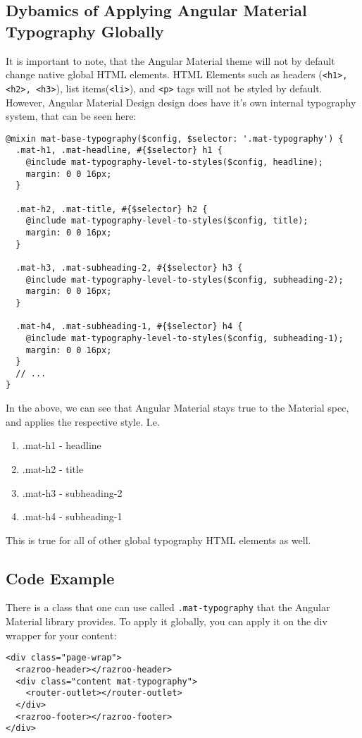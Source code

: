 \subsection{Dybamics of Applying Angular Material Typography Globally}
It is important to note, that the Angular Material theme will not by default 
change native global HTML elements. HTML Elements such as headers
(\lstinline{<h1>, <h2>, <h3>}), list items(\lstinline{<li>}), and \lstinline{<p>} 
tags will not be styled by default. However, Angular Material Design design 
does have it's own internal typography system, that can be seen here: 
\begin{lstlisting}[caption=@angular/material/\_theming.scss]
@mixin mat-base-typography($config, $selector: '.mat-typography') {
  .mat-h1, .mat-headline, #{$selector} h1 {
    @include mat-typography-level-to-styles($config, headline);
    margin: 0 0 16px;
  }

  .mat-h2, .mat-title, #{$selector} h2 {
    @include mat-typography-level-to-styles($config, title);
    margin: 0 0 16px;
  }

  .mat-h3, .mat-subheading-2, #{$selector} h3 {
    @include mat-typography-level-to-styles($config, subheading-2);
    margin: 0 0 16px;
  }

  .mat-h4, .mat-subheading-1, #{$selector} h4 {
    @include mat-typography-level-to-styles($config, subheading-1);
    margin: 0 0 16px;
  }  
  // ...
}
\end{lstlisting}

In the above, we can see that Angular Material stays true to the Material
spec, and applies the respective style. I.e. 
\begin{enumerate}
  \item .mat-h1 - headline
  \item .mat-h2 - title
  \item .mat-h3 - subheading-2
  \item .mat-h4 - subheading-1
\end{enumerate}

This is true for all of other global typography HTML elements as well. 

\subsection{Code Example}
There is a class that one can use called \lstinline{.mat-typography}
that the Angular Material library provides. To apply it globally, you 
can apply it on the div wrapper for your content: 
\begin{lstlisting}[caption=app.component.html]
<div class="page-wrap">
  <razroo-header></razroo-header>
  <div class="content mat-typography">
    <router-outlet></router-outlet>
  </div>
  <razroo-footer></razroo-footer>
</div>
\end{lstlisting}

